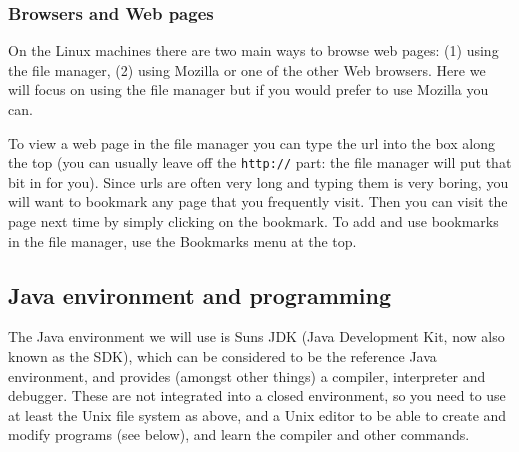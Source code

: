 \documentclass{article}
\newcommand{\fname}[1]{\texttt{#1}}
\begin{document}
\subsubsection*{Browsers and Web pages}

On the Linux machines there are two main ways to browse web pages:
(1) using the file manager, (2) using Mozilla or one of the other 
Web browsers.
Here we will focus on using the file manager but if you would prefer to
use Mozilla you can. 

To view a web page in the file manager you can type the url into
the box along the top (you can usually leave off the {\tt http://}
part: the file manager will put that bit in for you). Since urls are
often very long and typing them is very boring, you will want to
bookmark any page that you frequently visit. Then you can visit the
page next time by simply clicking on the bookmark. To add and use
bookmarks in the file manager, use the {\sf Bookmarks} menu at the top.

%
%

\subsection*{Java environment and programming}

The Java environment we will use is Suns JDK (Java Development
Kit, now also known as the SDK), which can be considered to be the reference 
Java environment, and provides (amongst other things)
a compiler, interpreter and debugger. These
are not integrated into a closed environment, so
you need to use at least the Unix file system as above, and 
a Unix editor to be able to create and modify programs (see below),
and learn the compiler and other commands. 
\end{document}
